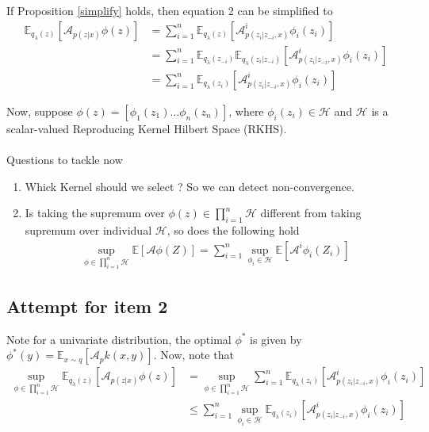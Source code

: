 \documentclass[12pt,twoside]{article}
\begin{document}
If Proposition \ref{simplify} holds, then equation 2 can be simplified to
\begin{align}
\mathbb{E}_{q_{\lambda}(z)}[ \mathcal{A}_{p(z | x)} \phi(z) ] &= \sum_{i=1}^{n}\mathbb{E}_{q_{\lambda}(z)}[ \mathcal{A}^{i}_{p(z_i | z_{-i}, x)} \phi_i(z_i) ]  \\
&= \sum_{i=1}^{n}\mathbb{E}_{q_{\lambda}(z_{-i})} \mathbb{E}_{q_{\lambda}(z_{i}| z_{-i})} [ \mathcal{A}^{i}_{p(z_i | z_{-i}, x)} \phi_i(z_i) ] \\
&= \sum_{i=1}^{n}\mathbb{E}_{q_{\lambda}(z_{i})}[ \mathcal{A}^{i}_{p(z_{i} | z_{-i}, x)} \phi_{i}(z_{i}) ]
\end{align}

Now, suppose $\phi(z) = [ \phi_{1}(z_{1}) \dots \phi_{n}(z_n) ]$, where $\phi_{i}(z_{i}) \in \mathcal{H}$ and $\mathcal{H}$ is a scalar-valued Reproducing Kernel Hilbert Space (RKHS).
\\
\\
Questions to tackle now
\begin{enumerate}
\item Whick Kernel should we select ? So we can detect non-convergence.
\item Is taking the supremum over $ \phi(z) \in \prod_{i=1}^{n} \mathcal{H}$ different from taking supremum over individual $\mathcal{H}$, so does the following hold
\begin{align*}
\sup_{\phi \in \prod_{i=1}^{n} \mathcal{H}} \mathbb{E}[\mathcal{A}\phi(Z)] = \sum_{i=1}^{n} \sup_{\phi_{i} \in \mathcal{H}} \mathbb{E}[\mathcal{A}^{i}\phi_{i}(Z_{i})]
\end{align*}
\end{enumerate}

\subsection{Attempt for item 2}

Note for a univariate distribution, the optimal $\phi^{*}$ is given by $\phi^{*}(y) = \mathbb{E}_{x \sim q}[ \mathcal{A}_{p}k(x,y) ]$. Now, note that
\begin{align*}
\sup_{\phi \in \prod_{i=1}^{n} \mathcal{H}} \mathbb{E}_{q_{\lambda}(z)}[ \mathcal{A}_{p(z | x)} \phi(z) ] &= \sup_{\phi \in \prod_{i=1}^{n} \mathcal{H}}\sum_{i=1}^{n}\mathbb{E}_{q_{\lambda}(z_{i})}[ \mathcal{A}^{i}_{p(z_{i} | z_{-i}, x)} \phi_{i}(z_{i}) ] \\
& \leq \sum_{i=1}^{n} \sup_{\phi_{i} \in \mathcal{H}} \mathbb{E}_{q_{\lambda}(z_{i})}[ \mathcal{A}^{i}_{p(z_{i} | z_{-i}, x)} \phi_{i}(z_{i}) ]
\end{align*}
\end{document}
